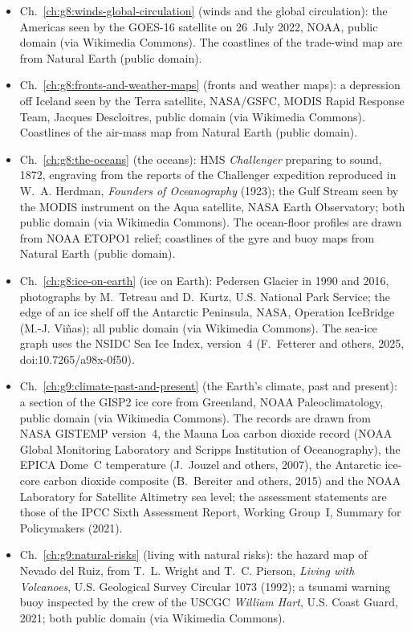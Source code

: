 \begin{itemize}
  \item Ch.~\ref{ch:g8:winds-global-circulation} (winds and the global circulation): the Americas seen by the GOES-16 satellite on 26~July 2022, NOAA, public domain (via Wikimedia Commons). The coastlines of the trade-wind map are from Natural Earth (public domain).
  \item Ch.~\ref{ch:g8:fronts-and-weather-maps} (fronts and weather maps): a depression off Iceland seen by the Terra satellite, NASA/GSFC, MODIS Rapid Response Team, Jacques Descloitres, public domain (via Wikimedia Commons). Coastlines of the air-mass map from Natural Earth (public domain).
  \item Ch.~\ref{ch:g8:the-oceans} (the oceans): HMS \emph{Challenger} preparing to sound, 1872, engraving from the reports of the Challenger expedition reproduced in W.~A. Herdman, \emph{Founders of Oceanography} (1923); the Gulf Stream seen by the MODIS instrument on the Aqua satellite, NASA Earth Observatory; both public domain (via Wikimedia Commons). The ocean-floor profiles are drawn from NOAA ETOPO1 relief; coastlines of the gyre and buoy maps from Natural Earth (public domain).
  \item Ch.~\ref{ch:g8:ice-on-earth} (ice on Earth): Pedersen Glacier in 1990 and 2016, photographs by M.~Tetreau and D.~Kurtz, U.S. National Park Service; the edge of an ice shelf off the Antarctic Peninsula, NASA, Operation IceBridge (M.-J. Viñas); all public domain (via Wikimedia Commons). The sea-ice graph uses the NSIDC Sea Ice Index, version~4 (F.~Fetterer and others, 2025, doi:10.7265/a98x-0f50).
  \item Ch.~\ref{ch:g9:climate-past-and-present} (the Earth's climate, past and present): a section of the GISP2 ice core from Greenland, NOAA Paleoclimatology, public domain (via Wikimedia Commons). The records are drawn from NASA GISTEMP version~4, the Mauna Loa carbon dioxide record (NOAA Global Monitoring Laboratory and Scripps Institution of Oceanography), the EPICA Dome~C temperature (J.~Jouzel and others, 2007), the Antarctic ice-core carbon dioxide composite (B.~Bereiter and others, 2015) and the NOAA Laboratory for Satellite Altimetry sea level; the assessment statements are those of the IPCC Sixth Assessment Report, Working Group~I, Summary for Policymakers (2021).
  \item Ch.~\ref{ch:g9:natural-risks} (living with natural risks): the hazard map of Nevado del Ruiz, from T.~L. Wright and T.~C. Pierson, \emph{Living with Volcanoes}, U.S. Geological Survey Circular 1073 (1992); a tsunami warning buoy inspected by the crew of the USCGC \emph{William Hart}, U.S. Coast Guard, 2021; both public domain (via Wikimedia Commons).

\end{itemize}
